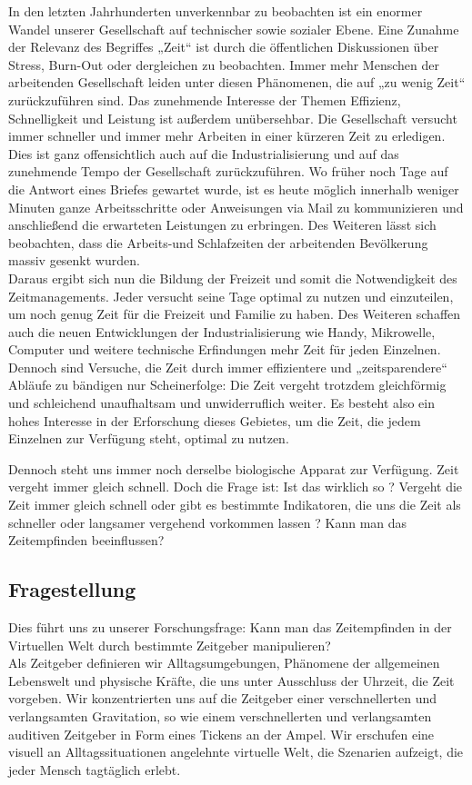 \documentclass{Paper}
\begin{document}
In den letzten Jahrhunderten unverkennbar zu beobachten ist ein enormer Wandel unserer Gesellschaft auf technischer sowie sozialer Ebene.
Eine Zunahme der Relevanz des Begriffes „Zeit“ ist durch die öffentlichen Diskussionen über Stress, Burn-Out oder dergleichen zu beobachten.
Immer mehr Menschen der arbeitenden Gesellschaft leiden unter diesen Phänomenen, die auf „zu wenig Zeit“ zurückzuführen sind. Das zunehmende Interesse der Themen Effizienz, Schnelligkeit und Leistung ist außerdem unübersehbar. Die Gesellschaft versucht immer schneller und immer mehr Arbeiten in einer kürzeren Zeit zu erledigen. Dies ist ganz offensichtlich auch auf die Industrialisierung und auf das zunehmende Tempo der Gesellschaft zurückzuführen. Wo früher noch Tage auf die Antwort eines Briefes gewartet wurde, ist es heute möglich innerhalb weniger Minuten ganze Arbeitsschritte oder Anweisungen via Mail zu kommunizieren und anschließend die erwarteten Leistungen zu erbringen.
Des Weiteren lässt sich beobachten, dass die Arbeits-und Schlafzeiten der arbeitenden Bevölkerung massiv gesenkt wurden.
\\
Daraus ergibt sich nun die Bildung der Freizeit und somit die Notwendigkeit des Zeitmanagements. Jeder versucht seine Tage optimal zu nutzen und einzuteilen, um noch genug Zeit für die Freizeit und Familie zu haben. Des Weiteren schaffen auch die neuen Entwicklungen der Industrialisierung wie Handy, Mikrowelle, Computer und weitere technische Erfindungen mehr Zeit für jeden Einzelnen. Dennoch sind Versuche, die Zeit durch immer effizientere und „zeitsparendere“ Abläufe zu bändigen nur Scheinerfolge: Die Zeit vergeht trotzdem gleichförmig und schleichend unaufhaltsam und unwiderruflich weiter. Es besteht also ein hohes Interesse in der Erforschung dieses Gebietes, um die Zeit, die jedem Einzelnen zur Verfügung steht, optimal zu nutzen.

Dennoch steht uns immer noch derselbe biologische Apparat zur Verfügung. Zeit vergeht immer gleich schnell. Doch die Frage ist: Ist das wirklich so ? Vergeht die Zeit immer gleich schnell oder gibt es bestimmte Indikatoren, die uns die Zeit als schneller oder langsamer vergehend vorkommen lassen ? Kann man das Zeitempfinden beeinflussen?

\subsection{Fragestellung }
Dies führt uns zu unserer Forschungsfrage: Kann man das Zeitempfinden in der Virtuellen Welt durch bestimmte Zeitgeber manipulieren?\\
Als Zeitgeber definieren wir Alltagsumgebungen, Phänomene der allgemeinen Lebenswelt und physische Kräfte, die uns unter Ausschluss der Uhrzeit, die Zeit vorgeben.
Wir konzentrierten uns auf die Zeitgeber einer verschnellerten und verlangsamten Gravitation, so wie einem verschnellerten und verlangsamten auditiven Zeitgeber in Form eines Tickens an der Ampel. Wir erschufen eine visuell an Alltagssituationen angelehnte virtuelle Welt, die Szenarien aufzeigt, die jeder Mensch tagtäglich erlebt.
\end{document}
